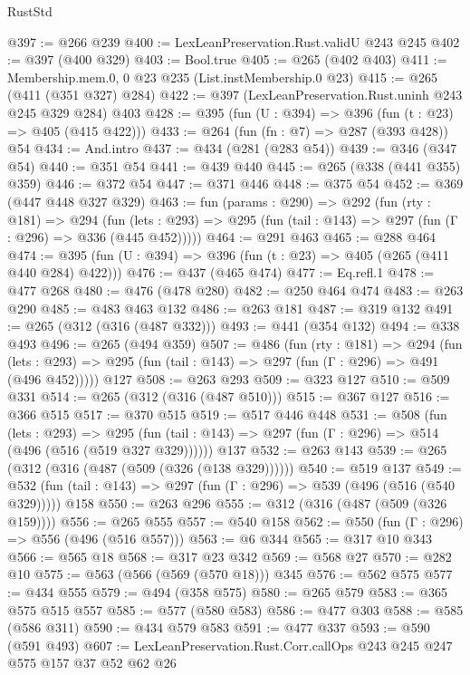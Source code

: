 \begin{lexlean}{RustStd}
\begin{coremodule}
{\begin{coremodule}
{{{{{{@397 := @266 @239
@400 := LexLeanPreservation.Rust.validU @243 @245
@402 := @397 (@400 @329)
@403 := Bool.true
@405 := @265 (@402 @403)
@411 := Membership.mem.{0, 0} @23 @235 (List.instMembership.{0} @23)
@415 := @265 (@411 (@351 @327) @284)
@422 := @397 (LexLeanPreservation.Rust.uninh @243 @245 @329 @284) @403
@428 := @395 (fun (U : @394) => @396 (fun (t : @23) => @405 (@415 @422)))
@433 := @264 (fun (fn : @7) => @287 (@393 @428)) @54
@434 := And.intro
@437 := @434 (@281 (@283 @54))
@439 := @346 (@347 @54)
@440 := @351 @54
@441 := @439 @440
@445 := @265 (@338 (@441 @355) @359)
@446 := @372 @54
@447 := @371 @446
@448 := @375 @54
@452 := @369 (@447 @448 @327 @329)
@463 := fun (params : @290) =>
  @292
    (fun (rty : @181) =>
    @294
      (fun (lets : @293) => @295 (fun (tail : @143) => @297 (fun (Γ : @296) => @336 (@445 @452)))))
@464 := @291 @463
@465 := @288 @464
@474 := @395 (fun (U : @394) => @396 (fun (t : @23) => @405 (@265 (@411 @440 @284) @422)))
@476 := @437 (@465 @474)
@477 := Eq.refl.{1}
@478 := @477 @268
@480 := @476 (@478 @280)
@482 := @250 @464 @474
@483 := @263 @290
@485 := @483 @463 @132
@486 := @263 @181
@487 := @319 @132
@491 := @265 (@312 (@316 (@487 @332)))
@493 := @441 (@354 @132)
@494 := @338 @493
@496 := @265 (@494 @359)
@507 := @486
    (fun (rty : @181) =>
    @294
      (fun (lets : @293) => @295 (fun (tail : @143) => @297 (fun (Γ : @296) => @491 (@496 @452)))))
    @127
@508 := @263 @293
@509 := @323 @127
@510 := @509 @331
@514 := @265 (@312 (@316 (@487 @510)))
@515 := @367 @127
@516 := @366 @515
@517 := @370 @515
@519 := @517 @446 @448
@531 := @508
    (fun (lets : @293) =>
    @295 (fun (tail : @143) => @297 (fun (Γ : @296) => @514 (@496 (@516 (@519 @327 @329))))))
    @137
@532 := @263 @143
@539 := @265 (@312 (@316 (@487 (@509 (@326 (@138 @329))))))
@540 := @519 @137
@549 := @532 (fun (tail : @143) => @297 (fun (Γ : @296) => @539 (@496 (@516 (@540 @329))))) @158
@550 := @263 @296
@555 := @312 (@316 (@487 (@509 (@326 @159))))
@556 := @265 @555
@557 := @540 @158
@562 := @550 (fun (Γ : @296) => @556 (@496 (@516 @557)))
@563 := @6 @344
@565 := @317 @10 @343
@566 := @565 @18
@568 := @317 @23 @342
@569 := @568 @27
@570 := @282 @10
@575 := @563 (@566 (@569 (@570 @18))) @345
@576 := @562 @575
@577 := @434 @555
@579 := @494 (@358 @575)
@580 := @265 @579
@583 := @365 @575 @515 @557
@585 := @577 (@580 @583)
@586 := @477 @303
@588 := @585 (@586 @311)
@590 := @434 @579 @583
@591 := @477 @337
@593 := @590 (@591 @493)
@607 := LexLeanPreservation.Rust.Corr.callOps
    @243
    @245
    @247
    @575
    @157
    @37
    @52
    @62
    @26
}}}}}}
\end{coremodule}}
\end{coremodule}
\end{lexlean}
